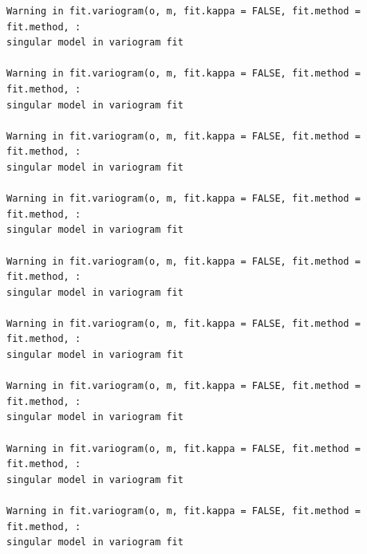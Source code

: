 \documentclass[
  letterpaper,
  DIV=11,
  numbers=noendperiod]{scrartcl}
\newenvironment{Shaded}{\begin{snugshade}}{\end{snugshade}}
\newcommand{\AttributeTok}[1]{\textcolor[rgb]{0.40,0.45,0.13}{#1}}
\newcommand{\CommentTok}[1]{\textcolor[rgb]{0.37,0.37,0.37}{#1}}
\newcommand{\ConstantTok}[1]{\textcolor[rgb]{0.56,0.35,0.01}{#1}}
\newcommand{\DecValTok}[1]{\textcolor[rgb]{0.68,0.00,0.00}{#1}}
\newcommand{\FunctionTok}[1]{\textcolor[rgb]{0.28,0.35,0.67}{#1}}
\newcommand{\NormalTok}[1]{\textcolor[rgb]{0.00,0.23,0.31}{#1}}
\newcommand{\OtherTok}[1]{\textcolor[rgb]{0.00,0.23,0.31}{#1}}
\newcommand{\StringTok}[1]{\textcolor[rgb]{0.13,0.47,0.30}{#1}}
\begin{document}
\begin{Shaded}
\end{Shaded}

\begin{verbatim}
Warning in fit.variogram(o, m, fit.kappa = FALSE, fit.method = fit.method, :
singular model in variogram fit

Warning in fit.variogram(o, m, fit.kappa = FALSE, fit.method = fit.method, :
singular model in variogram fit

Warning in fit.variogram(o, m, fit.kappa = FALSE, fit.method = fit.method, :
singular model in variogram fit

Warning in fit.variogram(o, m, fit.kappa = FALSE, fit.method = fit.method, :
singular model in variogram fit

Warning in fit.variogram(o, m, fit.kappa = FALSE, fit.method = fit.method, :
singular model in variogram fit

Warning in fit.variogram(o, m, fit.kappa = FALSE, fit.method = fit.method, :
singular model in variogram fit

Warning in fit.variogram(o, m, fit.kappa = FALSE, fit.method = fit.method, :
singular model in variogram fit

Warning in fit.variogram(o, m, fit.kappa = FALSE, fit.method = fit.method, :
singular model in variogram fit

Warning in fit.variogram(o, m, fit.kappa = FALSE, fit.method = fit.method, :
singular model in variogram fit
\end{verbatim}
\end{document}

